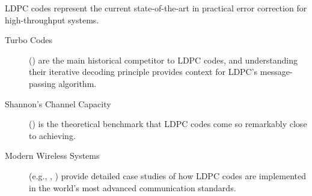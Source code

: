 \begin{importantbox}[title={Further Reading}]
    LDPC codes represent the current state-of-the-art in practical error correction for high-throughput systems.
    \begin{description}
        \item[Turbo Codes] () are the main historical competitor to LDPC codes, and understanding their iterative decoding principle provides context for LDPC's message-passing algorithm.
        \item[Shannon's Channel Capacity] () is the theoretical benchmark that LDPC codes come so remarkably close to achieving.
        \item[Modern Wireless Systems] (e.g., , ) provide detailed case studies of how LDPC codes are implemented in the world's most advanced communication standards.
    \end{description}
\end{importantbox}
